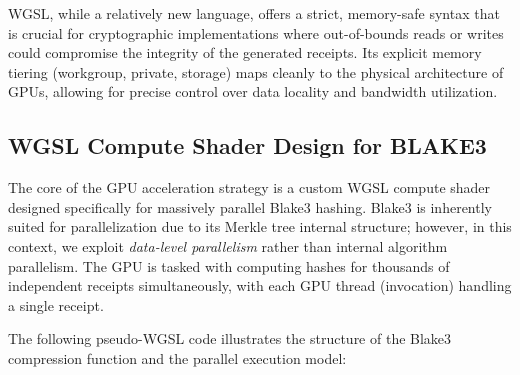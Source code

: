 WGSL, while a relatively new language, offers a strict, memory-safe syntax that is crucial for cryptographic implementations where out-of-bounds reads or writes could compromise the integrity of the generated receipts. Its explicit memory tiering (workgroup, private, storage) maps cleanly to the physical architecture of GPUs, allowing for precise control over data locality and bandwidth utilization.

\subsection{WGSL Compute Shader Design for BLAKE3}

The core of the GPU acceleration strategy is a custom WGSL compute shader designed specifically for massively parallel Blake3 hashing. Blake3 is inherently suited for parallelization due to its Merkle tree internal structure; however, in this context, we exploit \textit{data-level parallelism} rather than internal algorithm parallelism. The GPU is tasked with computing hashes for thousands of independent receipts simultaneously, with each GPU thread (invocation) handling a single receipt.

The following pseudo-WGSL code illustrates the structure of the Blake3 compression function and the parallel execution model:

